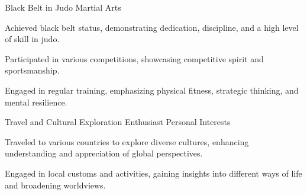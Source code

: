 

\begin{cventries}

  \cventry
    {Black Belt in Judo} %
    {Martial Arts} %
    {} %
    {} %
    {
      \begin{cvitems} %
        \item {Achieved black belt status, demonstrating dedication, discipline, and a high level of skill in judo.}
        \item {Participated in various competitions, showcasing competitive spirit and sportsmanship.}
        \item {Engaged in regular training, emphasizing physical fitness, strategic thinking, and mental resilience.}
      \end{cvitems}
    }

  \cventry
    {Travel and Cultural Exploration Enthusiast} %
    {Personal Interests} %
    {} %
    {} %
    {
      \begin{cvitems}
        \item {Traveled to various countries to explore diverse cultures, enhancing understanding and appreciation of global perspectives.}
        \item {Engaged in local customs and activities, gaining insights into different ways of life and broadening worldviews.}
      \end{cvitems}
    }
\end{cventries}

